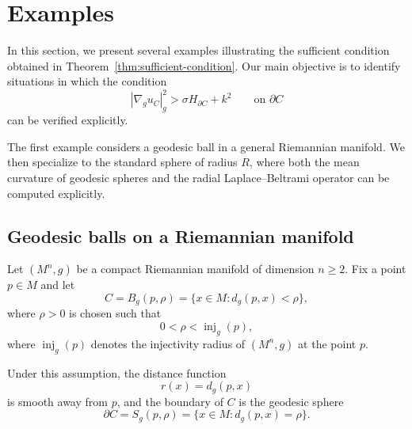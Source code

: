 \documentclass{article}
\begin{document}
\section{Examples}
\label{sec:examples}

In this section, we present several examples illustrating the sufficient
condition obtained in Theorem~\ref{thm:sufficient-condition}. Our main
objective is to identify situations in which the condition
\begin{equation}
|\nabla_g u_C|_g^2
>
\sigma H_{\partial C}+k^2
\qquad\text{on }\partial C
\label{eq:sufficient-condition-examples}
\end{equation}
can be verified explicitly.

The first example considers a geodesic ball in a general Riemannian
manifold. We then specialize to the standard sphere of radius $R$, where
both the mean curvature of geodesic spheres and the radial Laplace--Beltrami
operator can be computed explicitly.

\subsection{Geodesic balls on a Riemannian manifold}
\label{subsec:geodesic-ball}

Let $(M^n,g)$ be a compact Riemannian manifold of dimension $n\geq2$.
Fix a point $p\in M$ and let
\[
C=B_g(p,\rho)
=
\{x\in M:d_g(p,x)<\rho\},
\]
where $\rho>0$ is chosen such that
\begin{equation}
0<\rho<\operatorname{inj}_g(p),
\label{eq:rho-inj-radius}
\end{equation}
where $\operatorname{inj}_g(p)$ denotes the injectivity radius of $(M^n,g)$ at the point $p.$

Under this assumption, the distance function
\[
r(x)=d_g(p,x)
\]
is smooth away from $p$, and the boundary of $C$ is the geodesic sphere
\[
\partial C=S_g(p,\rho)
=
\{x\in M:d_g(p,x)=\rho\}.
\]
\end{document}
